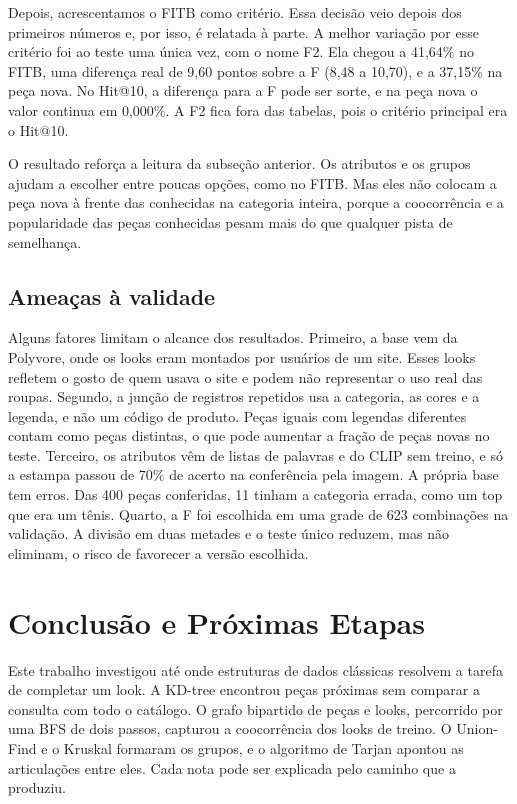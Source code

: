 \documentclass[conference]{IEEEtran}
\begin{document}
Depois, acrescentamos o FITB como critério. Essa decisão veio depois dos primeiros números e, por isso, é relatada à parte. A melhor variação por esse critério foi ao teste uma única vez, com o nome F2. Ela chegou a 41,64\% no FITB, uma diferença real de 9,60 pontos sobre a F (8,48 a 10,70), e a 37,15\% na peça nova. No Hit@10, a diferença para a F pode ser sorte, e na peça nova o valor continua em 0,000\%. A F2 fica fora das tabelas, pois o critério principal era o Hit@10.

O resultado reforça a leitura da subseção anterior. Os atributos e os grupos ajudam a escolher entre poucas opções, como no FITB. Mas eles não colocam a peça nova à frente das conhecidas na categoria inteira, porque a coocorrência e a popularidade das peças conhecidas pesam mais do que qualquer pista de semelhança.

\subsection{Ameaças à validade}

Alguns fatores limitam o alcance dos resultados. Primeiro, a base vem da Polyvore, onde os looks eram montados por usuários de um site. Esses looks refletem o gosto de quem usava o site e podem não representar o uso real das roupas. Segundo, a junção de registros repetidos usa a categoria, as cores e a legenda, e não um código de produto. Peças iguais com legendas diferentes contam como peças distintas, o que pode aumentar a fração de peças novas no teste. Terceiro, os atributos vêm de listas de palavras e do CLIP sem treino, e só a estampa passou de 70\% de acerto na conferência pela imagem. A própria base tem erros. Das 400 peças conferidas, 11 tinham a categoria errada, como um top que era um tênis. Quarto, a F foi escolhida em uma grade de 623 combinações na validação. A divisão em duas metades e o teste único reduzem, mas não eliminam, o risco de favorecer a versão escolhida.

\section{Conclusão e Próximas Etapas}
\label{sec:conc}
Este trabalho investigou até onde estruturas de dados clássicas resolvem a tarefa de completar um look. A KD-tree encontrou peças próximas sem comparar a consulta com todo o catálogo. O grafo bipartido de peças e looks, percorrido por uma BFS de dois passos, capturou a coocorrência dos looks de treino. O Union-Find e o Kruskal formaram os grupos, e o algoritmo de Tarjan apontou as articulações entre eles. Cada nota pode ser explicada pelo caminho que a produziu.
\end{document}
